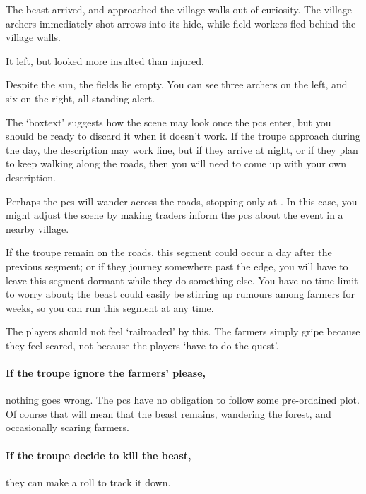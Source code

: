 \begin{multicols}{2}
\begin{exampletext}
  The beast arrived, and approached the \gls{village} walls out of curiosity.
  The \gls{village} archers immediately shot arrows into its hide, while field-workers fled behind the \gls{village} walls.

  It left, but looked more insulted than injured.
\end{exampletext}

\begin{boxtext}
  Despite the sun, the fields lie empty.
  You can see three archers on the left, and six on the right, all standing alert.
\end{boxtext}

The `boxtext' suggests how the scene may look once the \glspl{pc} enter, but you should be ready to discard it when it doesn't work.
If the troupe approach  during the day, the description may work fine, but if they arrive at night, or if they plan to keep walking along the roads, then you will need to come up with your own description.

Perhaps the \glspl{pc} will wander across the roads, stopping only at .
In this case, you might adjust the scene by making traders inform the \glspl{pc} about the event in a nearby \gls{village}.

If the troupe remain on the roads, this \gls{segment} could occur a day after the previous \gls{segment}; or if they journey somewhere past the \gls{edge}, you will have to leave this \gls{segment} dormant while they do something else.
You have no time-limit to worry about; the beast could easily be stirring up rumours among farmers for weeks, so you can run this \gls{segment} at any time.

The players should not feel `railroaded' by this.
The farmers simply gripe because they feel scared, not because the players `have to do the quest'.

\paragraph{If the troupe ignore the farmers' please,}
nothing goes wrong.
The \glspl{pc} have no obligation to follow some pre-ordained plot.
Of course that will mean that the beast remains, wandering the forest, and occasionally scaring farmers.

\paragraph{If the troupe decide to kill the beast,}
they can make a roll to track it down.


\end{multicols}
